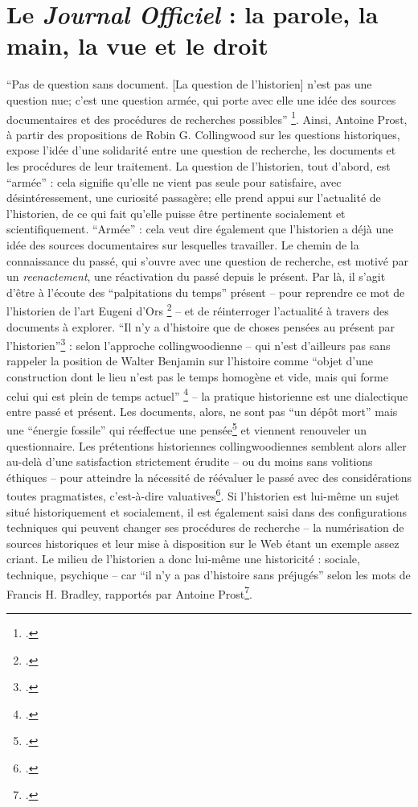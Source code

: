 \chapter[Le \textit{Journal Officiel}]{Le \emph{Journal Officiel} : la parole, la main, la vue et le droit}

\enquote{Pas de question sans document. [La question de l'historien] n'est pas une question nue; c'est une question armée, qui porte avec elle une idée des sources documentaires et des procédures de recherches possibles} \footcite[][p. 80]{prost}. Ainsi, Antoine Prost, à partir des propositions de Robin G. Collingwood sur les questions historiques, expose l'idée d'une solidarité entre une question de recherche, les documents et les procédures de leur traitement. La question de l'historien, tout d'abord, est \enquote{armée} : cela signifie qu'elle ne vient pas seule pour satisfaire, avec désintéressement, une curiosité passagère; elle prend appui sur l'actualité de l'historien, de ce qui fait qu'elle puisse être pertinente socialement et scientifiquement. \enquote{Armée} : cela veut dire également que l'historien a déjà une idée des sources documentaires sur lesquelles travailler. Le chemin de la connaissance du passé, qui s'ouvre avec une question de recherche, est motivé par un \emph{reenactement}, une réactivation du passé depuis le présent. Par là, il s'agit d'être à l'écoute des \enquote{palpitations du temps} présent -- pour reprendre ce mot de l'historien de l'art Eugeni d'Ors \footcite[][]{ors} -- et de réinterroger l'actualité à travers des documents à explorer. \enquote{Il n'y a d'histoire que de choses pensées au présent par l'historien}\footcite[][p.166]{prost} : selon l'approche collingwoodienne -- qui n'est d'ailleurs pas sans rappeler la position de Walter Benjamin sur l'histoire comme \enquote{objet d’une construction dont le lieu n’est pas le temps homogène et vide, mais qui forme celui qui est plein de temps actuel} \footcite[][]{benjamin} -- la pratique historienne est une dialectique entre passé et présent. Les documents, alors, ne sont pas \enquote{un dépôt mort} mais une \enquote{énergie fossile} qui réeffectue une pensée\footcite[][]{libera} et viennent renouveler un questionnaire. Les prétentions historiennes collingwoodiennes semblent alors aller au-delà d'une satisfaction strictement érudite -- ou du moins sans volitions éthiques -- pour atteindre la nécessité de réévaluer le passé avec des considérations toutes pragmatistes, c'est-à-dire valuatives\footcite[][]{dewey}. Si l'historien est lui-même un sujet situé historiquement et socialement, il est également saisi dans des configurations techniques qui peuvent changer ses procédures de recherche -- la numérisation de sources historiques et leur mise à disposition sur le Web étant un exemple assez criant. Le milieu de l'historien a donc lui-même une historicité : sociale, technique, psychique --  car \enquote{il n'y a pas d'histoire sans préjugés} selon les mots de Francis H. Bradley, rapportés par Antoine Prost\footcite[][p. 96]{prost}.

